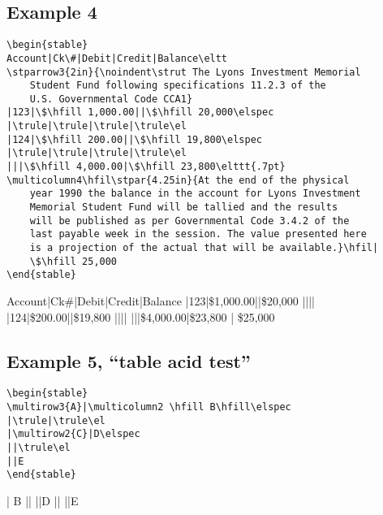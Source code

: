 \documentclass{article}
\begin{document}
\subsection{Example 4}

\begin{verbatim}
\begin{stable}
Account|Ck\#|Debit|Credit|Balance\eltt
\stparrow3{2in}{\noindent\strut The Lyons Investment Memorial 
	Student Fund following specifications 11.2.3 of the 
	U.S. Governmental Code CCA1}
|123|\$\hfill 1,000.00||\$\hfill 20,000\elspec
|\trule|\trule|\trule|\trule\el
|124|\$\hfill 200.00||\$\hfill 19,800\elspec
|\trule|\trule|\trule|\trule\el
|||\$\hfill 4,000.00|\$\hfill 23,800\elttt{.7pt}
\multicolumn4\hfil\stpar{4.25in}{At the end of the physical
	year 1990 the balance in the account for Lyons Investment
	Memorial Student Fund will be tallied and the results 
	will be published as per Governmental Code 3.4.2 of the
	last payable week in the session. The value presented here 
	is a projection of the actual that will be available.}\hfil|
	\$\hfill 25,000
\end{stable}
\end{verbatim}

\begin{stable}
Account|Ck\#|Debit|Credit|Balance\eltt
{}
|123|\$\hfill 1,000.00||\$\hfill 20,000\elspec
|\trule|\trule|\trule|\trule\el
|124|\$\hfill 200.00||\$\hfill 19,800\elspec
|\trule|\trule|\trule|\trule\el
|||\$\hfill 4,000.00|\$\hfill 23,800\elttt{.7pt}
\hfil{}\hfil|
	\$\hfill 25,000
\end{stable}

\subsection{Example 5, ``table acid test''}

\begin{verbatim}
\begin{stable}
\multirow3{A}|\multicolumn2 \hfill B\hfill\elspec
|\trule|\trule\el
|\multirow2{C}|D\elspec
||\trule\el
||E
\end{stable}
\end{verbatim}

\begin{stable}
| \hfill B\hfill\elspec
|\trule|\trule\el
||D\elspec
||\trule\el
||E
\end{stable}
\end{document}
